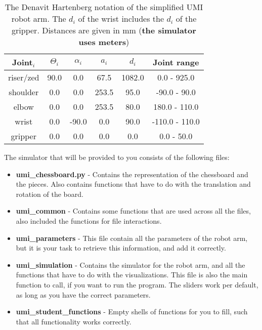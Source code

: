 \documentclass{article}
\begin{document}
\begin{table}[h!]
    \centering
    \begin{tabular}{|c|c|c|c|c|c|} \hline
        Joint$_i$ & $\Theta_i$ & $\alpha_i$ & $a_i$ & $d_i$ & Joint range \\ \hline
        riser/zed & 90.0 & 0.0 & 67.5 & 1082.0 & 0.0 - 925.0 \\ \hline
        shoulder & 0.0 & 0.0 & 253.5 & 95.0 & -90.0 - 90.0 \\ \hline
        elbow & 0.0 & 0.0 & 253.5 & 80.0 & 180.0 - 110.0 \\ \hline
        wrist & 0.0 & -90.0 & 0.0 & 90.0 & -110.0 - 110.0 \\ \hline
        gripper & 0.0 & 0.0 & 0.0 & 0.0 & 0.0 - 50.0 \\ \hline
    \end{tabular}
    \caption{The Denavit Hartenberg notation of the simplified UMI robot arm. The $d_i$ of the wrist includes the $d_i$ of the gripper. Distances are given in mm (\textbf{the simulator uses meters})}
    \label{tab:denavit}
\end{table}

The simulator that will be provided to you consists of the following files:
\begin{itemize}
    \item \textbf{umi\_chessboard.py} - Contains the representation of the chessboard and the pieces. Also contains functions that have to do with the translation and rotation of the board.
    \item \textbf{umi\_common} - Contains some functions that are used across all the files, also included the functions for file interactions.
    \item \textbf{umi\_parameters} - This file contain all the parameters of the robot arm, but it is your task to retrieve this information, and add it correctly.
    \item \textbf{umi\_simulation} - Contains the simulator for the robot arm, and all the functions that have to do with the visualizations. This file is also the main function to call, if you want to run the program. The sliders work per default, as long as you have the correct parameters.
    \item \textbf{umi\_student\_functions} - Empty shells of functions for you to fill, such that all functionality works correctly.
\end{itemize}
\end{document}
